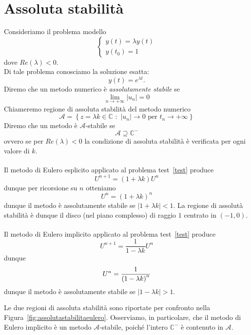 \section{Assoluta stabilit\`a}
Consideriamo il problema modello 
$$ \label{test}\begin{cases}y(t) = \lambda y(t) \\
y\left(t_0\right) = 1
\end{cases}
$$
dove $Re(\lambda) <0$.\\
Di tale problema conosciamo la soluzione esatta:  $$y(t) = e^{\lambda t}.$$
Diremo che un metodo numerico \`e \textit{assolutamente stabile} se 
$$ \lim_{n\to + \infty} \left| u_n \right| = 0 $$ 
Chiameremo  regione di assoluta stabilit\`a del metodo numerico 
$$\mathcal{A}=\left\{ z = \lambda k \in \mathbb{C}\,\, :\,\, | u_n| \to 0 \text{ per } t_n \to +\infty\right\}$$ 
Diremo che un metodo \`e $\mathcal{A}$-stabile se 
$$ \mathcal{A}\supseteq \mathbb{C}^-$$
ovvero se per $Re(\lambda)<0$ la condizione di assoluta stabilit\`a \`e verificata per ogni valore di $k$. \\ \\
Il metodo di Eulero esplicito applicato al problema test~\eqref{test} produce
$$ U^{n+1} = (1 + \lambda k) U^n$$
dunque per ricorsione su $n$ otteniamo 
$$ U^n = (1 + \lambda k)^n $$ 
dunque il metodo \`e assolutamente stabile se $ | 1 + \lambda k |< 1$.  La regione di assolut\`a stabilit\`a \`e dunque il disco (nel piano complesso) di raggio $1$ centrato in $(-1,0)$.\\ \\

Il metodo di Eulero implicito  applicato al problema test~\eqref{test} produce 
$$ U^{n+1} = \frac{1}{1-\lambda k} U^n$$
dunque 
$$ U^n = \frac{ 1}{\left(  1 - \lambda k \right)^n}$$
dunque il metodo \`e assolutamente stabile se $| 1 - \lambda k| >1$.

Le due regioni di assoluta stabilità sono riportate per confronto nella Figura~\ref{fig:assolutastabilitaeulero}. Osserviamo, in particolare, che il metodo di Eulero implicito è un metodo $\mathcal{A}$-stabile, poiché l'intero $\mathbb{C}^{-}$ è contenuto in $\mathcal{A}$.

